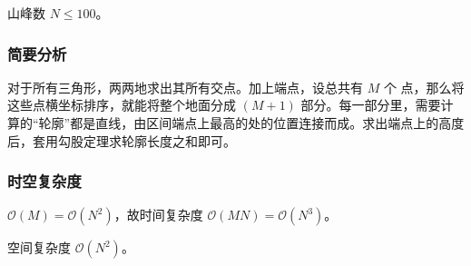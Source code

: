 				山峰数 $N \le 100$。
			\subsubsection{简要分析}
				对于所有三角形，两两地求出其所有交点。加上端点，设总共有 $M$ 个 点，那么将这些点横坐标排序，就能将整个地面分成 $(M + 1)$ 部分。每一部分里，需要计算的“轮廓”都是直线，由区间端点上最高的处的位置连接而成。求出端点上的高度后，套用勾股定理求轮廓长度之和即可。
				
			\subsubsection{时空复杂度}
				$\mathcal{O}(M) =  \mathcal{O}\left(N^2\right)$，故时间复杂度
				$ \mathcal{O}\left(MN\right) = \mathcal{O}\left(N^3\right)$。
				
				空间复杂度 $\mathcal{O}\left(N^2\right)$。
				
				
		\newpage
			
			